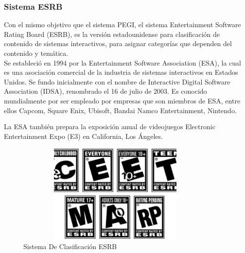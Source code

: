 \subsubsection{Sistema ESRB}

Con el mismo objetivo que el sistema PEGI, el sistema Entertainment Software Rating Board (ESRB), es la versión estadounidense para clasificación de contenido de sistemas interactivos, para asignar categorías que dependen del contenido y temática. 
\\
Se estableció en 1994 por la Entertainment Software Association (ESA), la cual es una asociación comercial de la industria de sistemas interactivos en Estados Unidos. Se fundo inicialmente con el nombre de Interactive Digital Software Association (IDSA), renombrado el 16 de julio de 2003. Es conocido mundialmente por ser empleado por empresas que son miembros de ESA, entre ellos Capcom, Square Enix, Ubisoft, Bandai Namco Entertainment, Nintendo. 

La ESA también prepara la exposición anual de videojuegos Electronic Entertainment Expo (E3) en California, Los Ángeles.

\begin{figure}[t!]
	\centering
	\includegraphics[width=10cm,height=5cm,]{./Images/esrb.jpg}
	\caption{Sistema De Clasificación ESRB}
	\label{esrb}
\end{figure}

